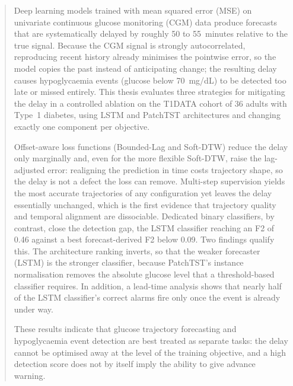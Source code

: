 \begin{abstract}

Deep learning models trained with mean squared error (MSE) on univariate continuous glucose monitoring (CGM) data produce forecasts that are systematically delayed by roughly 50 to 55~minutes relative to the true signal. Because the CGM signal is strongly autocorrelated, reproducing recent history already minimises the pointwise error, so the model copies the past instead of anticipating change; the resulting delay causes hypoglycaemia events (glucose below 70~mg/dL) to be detected too late or missed entirely. This thesis evaluates three strategies for mitigating the delay in a controlled ablation on the T1DATA cohort of 36 adults with Type~1 diabetes, using LSTM and PatchTST architectures and changing exactly one component per objective.

Offset-aware loss functions (Bounded-Lag and Soft-DTW) reduce the delay only marginally and, even for the more flexible Soft-DTW, raise the lag-adjusted error: realigning the prediction in time costs trajectory shape, so the delay is not a defect the loss can remove. Multi-step supervision yields the most accurate trajectories of any configuration yet leaves the delay essentially unchanged, which is the first evidence that trajectory quality and temporal alignment are dissociable. Dedicated binary classifiers, by contrast, close the detection gap, the LSTM classifier reaching an F2 of 0.46 against a best forecast-derived F2 below 0.09. Two findings qualify this. The architecture ranking inverts, so that the weaker forecaster (LSTM) is the stronger classifier, because PatchTST's instance normalisation removes the absolute glucose level that a threshold-based classifier requires. In addition, a lead-time analysis shows that nearly half of the LSTM classifier's correct alarms fire only once the event is already under way.

These results indicate that glucose trajectory forecasting and hypoglycaemia event detection are best treated as separate tasks: the delay cannot be optimised away at the level of the training objective, and a high detection score does not by itself imply the ability to give advance warning.

\end{abstract}
